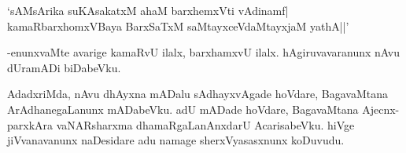 \begin{shloka}
`sAMsArika suKAsakatxM ahaM barxhemxVti vAdinamf|\\
kamaRbarxhomxV\s Baya BarxSaTxM saMtayxceVdaMtayxjaM yathA||'
\end{shloka}

-enunxvaMte avarige kamaRvU ilalx, barxhamxvU ilalx. hAgiruvavaranunx nAvu dUramADi biDabeVku.

AdadxriMda, nAvu dhAyxna mADalu sAdhayxvAgade hoVdare, BagavaMtana ArAdhanegaLanunx mADabeVku. adU mADade hoVdare, BagavaMtana Ajecnx-parxkAra vaNARsharxma dhamaRgaLanAnxdarU AcarisabeVku. hiVge jiVvanavanunx naDesidare adu namage sherxVyasasxnunx koDuvudu.


\endchapter
